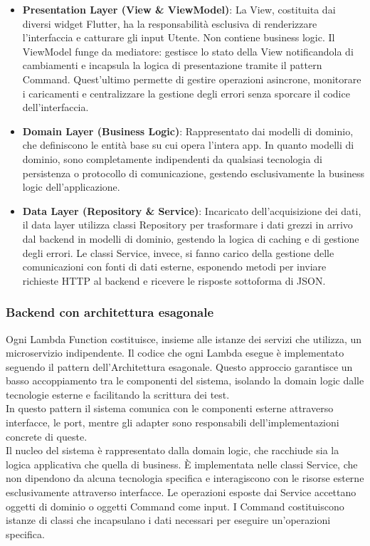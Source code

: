 \documentclass[a4paper,12pt]{article}
\newcommand{\ignoreglossary}{}
\newcommand{\code}[1]{{\ttfamily\textcolor{purple!85!black}{#1}}}
\begin{document}
\begin{itemize}
	\item \textbf{Presentation Layer (View \& ViewModel)}: La View, costituita dai diversi widget Flutter, ha la responsabilità esclusiva di renderizzare l'interfaccia e catturare gli input Utente. Non contiene business logic. Il ViewModel funge da mediatore: gestisce lo stato della View notificandola di cambiamenti e incapsula la logica di presentazione tramite il pattern Command. Quest'ultimo permette di gestire operazioni asincrone, monitorare i caricamenti e centralizzare la gestione degli errori senza sporcare il codice dell'interfaccia.
	\item \textbf{Domain Layer (Business Logic)}: Rappresentato dai modelli di dominio, che definiscono le entità base su cui opera l'intera app. In quanto modelli di dominio, sono completamente indipendenti da qualsiasi tecnologia di persistenza o protocollo di comunicazione, gestendo esclusivamente la business logic dell'applicazione.
	\item \textbf{Data Layer (\ignoreglossary{Repository} \& Service)}: Incaricato dell'acquisizione dei dati, il data layer utilizza classi Repository per trasformare i dati grezzi in arrivo dal backend in modelli di dominio, gestendo la logica di caching e di gestione degli errori. Le classi Service, invece, si fanno carico della gestione delle comunicazioni con fonti di dati esterne, esponendo metodi per inviare richieste HTTP al backend e ricevere le risposte sottoforma di JSON.
\end{itemize}

\subsubsection{Backend con architettura esagonale}
Ogni Lambda Function costituisce, insieme alle istanze dei servizi che utilizza, un microservizio indipendente. Il codice che ogni Lambda esegue è implementato seguendo il pattern dell'Architettura esagonale. 
Questo approccio garantisce un basso accoppiamento tra le componenti del sistema, isolando la domain logic dalle tecnologie esterne e facilitando la scrittura dei test.\\
In questo pattern il sistema comunica con le componenti esterne attraverso interfacce, le port, mentre 
gli adapter sono responsabili dell'implementazioni concrete di queste.\\

Il nucleo del sistema è rappresentato dalla domain logic, che racchiude sia la logica applicativa che quella di business. È implementata nelle classi \code{Service},
che non dipendono da alcuna tecnologia specifica e interagiscono con le risorse esterne esclusivamente attraverso interfacce. Le operazioni esposte dai \code{Service} accettano
oggetti di dominio o oggetti Command come input. I Command costituiscono istanze di classi che incapsulano i dati necessari per eseguire un'operazioni specifica.\\
\end{document}
